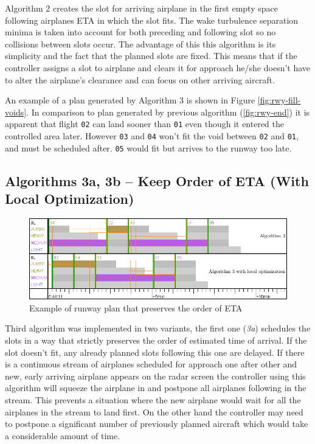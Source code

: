 Algorithm 2 creates the slot for arriving airplane in the first empty space following airplanes ETA in which the slot fits. The wake turbulence separation minima is taken into account for both preceding and following slot so no collisions between slots occur. The advantage of this this algorithm is its simplicity and the fact that the planned slots are fixed. This means that if the controller assigns a slot to airplane and clears it for approach he/she doesn't have to alter the airplane's clearance and can focus on other arriving aircraft.

An example of a plan generated by Algorithm 3 is shown in Figure \ref{fig:rwy-fill-voids}. In comparison to plan generated by previous algorithm (\ref{fig:rwy-end}) it is apparent that flight \texttt{02} can land sooner than \texttt{01} even though it entered the controlled area later. However \texttt{03} and \texttt{04} won't fit the void between \texttt{02} and \texttt{01}, and must be scheduled after. \texttt{05} would fit but arrives to the runway too late.

\subsection{Algorithms 3a, 3b – Keep Order of ETA (With Local Optimization)}

\begin{figure}[h]
    \centering
    \includegraphics[width=\textwidth]{figures/rwy-eta-order.png}
    \caption{Example of runway plan that preserves the order of ETA}
    \label{fig:rwy-eta-order}
\end{figure}

Third algorithm was implemented in two variants, the first one ({\em 3a}) schedules the slots in a way that strictly preserves the order of estimated time of arrival. If the slot doesn't fit, any already planned slots following this one are delayed. If there is a continuous stream of airplanes scheduled for approach one after other and new, early arriving airplane appears on the radar screen the controller using this algorithm will squeeze the airplane in and postpone all airplanes following in the stream. This prevents a situation where the new airplane would wait for all the airplanes in the stream to land first. On the other hand the controller may need to postpone a significant number of previously planned aircraft which would take a considerable amount of time.

